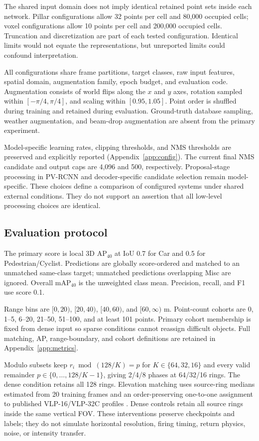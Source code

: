 \documentclass[10pt,twocolumn]{article}
\begin{document}
The shared input domain does not imply identical retained point sets inside each network. Pillar configurations allow 32 points per cell and 80,000 occupied cells; voxel configurations allow 10 points per cell and 200,000 occupied cells. Truncation and discretization are part of each tested configuration. Identical limits would not equate the representations, but unreported limits could confound interpretation.


All configurations share frame partitions, target classes, raw input features, spatial domain, augmentation family, epoch budget, and evaluation code. Augmentation consists of world flips along the $x$ and $y$ axes, rotation sampled within $[-\pi/4,\pi/4]$, and scaling within $[0.95,1.05]$. Point order is shuffled during training and retained during evaluation. Ground-truth database sampling, weather augmentation, and beam-drop augmentation are absent from the primary experiment.

Model-specific learning rates, clipping thresholds, and NMS thresholds are preserved and explicitly reported (Appendix~\ref{app:config}). The current final NMS candidate and output caps are 4,096 and 500, respectively. Proposal-stage processing in PV-RCNN and decoder-specific candidate selection remain model-specific. These choices define a comparison of configured systems under shared external conditions. They do not support an assertion that all low-level processing choices are identical.

\FloatBarrier
\subsection{Evaluation protocol}
The primary score is local 3D $\mathrm{AP}_{40}$ at IoU 0.7 for Car and 0.5 for Pedestrian/Cyclist. Predictions are globally score-ordered and matched to an unmatched same-class target; unmatched predictions overlapping Misc are ignored. Overall $\mathrm{mAP}_{40}$ is the unweighted class mean. Precision, recall, and F1 use score 0.1.

Range bins are $[0,20)$, $[20,40)$, $[40,60)$, and $[60,\infty)$ m. Point-count cohorts are 0, 1--5, 6--20, 21--50, 51--100, and at least 101 points. Primary cohort membership is fixed from dense input so sparse conditions cannot reassign difficult objects. Full matching, AP, range-boundary, and cohort definitions are retained in Appendix~\ref{app:metrics}.

Modulo subsets keep $r_i\bmod(128/K)=p$ for $K\in\{64,32,16\}$ and every valid remainder $p\in\{0,\ldots,128/K-1\}$, giving 2/4/8 phases at 64/32/16 rings. The dense condition retains all 128 rings. Elevation matching uses source-ring medians estimated from 20 training frames and an order-preserving one-to-one assignment to published VLP-16/VLP-32C profiles \cite{velodyne_profiles}. Dense controls retain all source rings inside the same vertical FOV. These interventions preserve checkpoints and labels; they do not simulate horizontal resolution, firing timing, return physics, noise, or intensity transfer.
\end{document}
